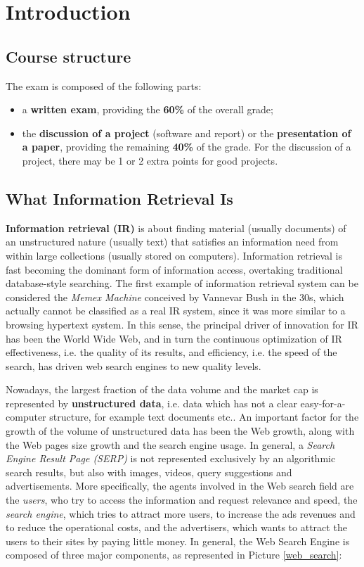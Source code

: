 \section{Introduction} \label{ch1}

\subsection{Course structure}

The exam is composed of the following parts:

\begin{itemize}
    \item a \textbf{written exam}, providing the \textbf{60\%} of the overall grade;
    \item the \textbf{discussion of a project} (software and report) or the \textbf{presentation of a paper}, providing the remaining \textbf{40\%} of the grade. For the discussion of a project, there may be 1 or 2 extra points for good projects.
\end{itemize}

\subsection{What Information Retrieval Is}
\textbf{Information retrieval (IR)} is about finding material (usually documents) of an unstructured nature (usually text) that satisfies an information need from within large collections (usually stored on computers). Information retrieval is fast becoming the dominant form of information access, overtaking traditional database-style searching. The first example of information retrieval system can be considered the \textit{Memex Machine} conceived by Vannevar Bush in the 30s, which actually cannot be classified as a real IR system, since it was more similar to a browsing hypertext system. In this sense, the principal driver of innovation for IR has been the World Wide Web, and in turn the continuous optimization of IR effectiveness, i.e. the quality of its results, and efficiency, i.e. the speed of the search, has driven web search engines to new quality levels.

Nowadays, the largest fraction of the data volume and the market cap is represented by \textbf{unstructured data}, i.e. data which has not a clear easy-for-a-computer structure, for example text documents etc.. An important factor for the growth of the volume of unstructured data has been the Web growth, along with the Web pages size growth and the search engine usage. In general, a \textit{Search Engine Result Page (SERP)} is not represented exclusively by an algorithmic search results, but also with images, videos, query suggestions and advertisements. More specifically, the agents involved in the Web search field are the \textit{users}, who try to access the information and request relevance and speed, the \textit{search engine}, which tries to attract more users, to increase the ads revenues and to reduce the operational costs, and the advertisers, which wants to attract the users to their sites by paying little money. In general, the Web Search Engine is composed of three major components, as represented in Picture \ref{web_search}:

